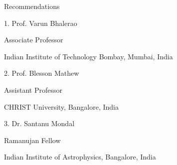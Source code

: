 \begin{section}{Recommendations}
    \begin{subsectionnobullet}{1. Prof. Varun Bhalerao}{}{}{}
        \item{Associate Professor}
        \item{Indian Institute of Technology Bombay, Mumbai, India}
    \end{subsectionnobullet}
        
    \begin{subsectionnobullet}{2. Prof. Blesson Mathew}{}{}{}
        \item{Assistant Professor}
        \item{CHRIST University, Bangalore, India}
    \end{subsectionnobullet}
        
    \begin{subsectionnobullet}{3. Dr. Santanu Mondal}{}{}{}
        \item{Ramanujan Fellow}
        \item{Indian Institute of Astrophysics, Bangalore, India}
    \end{subsectionnobullet}

\end{section}
